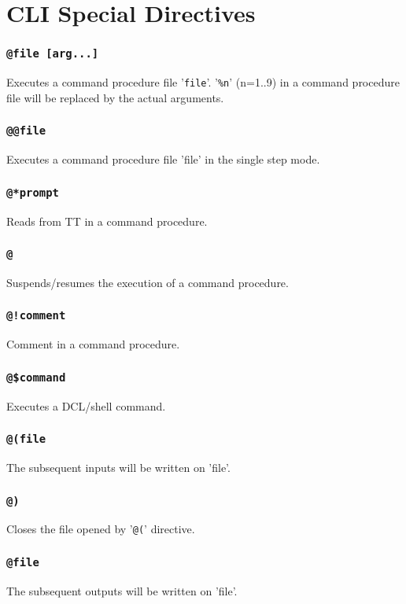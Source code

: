 \chapter{CLI Special Directives}
\subsection*{{\tt @file\ [arg...]}}
  Executes a command procedure file '{\tt file}'. 
  '{\tt \%n}' (n=1..9) in a command 
  procedure file will be replaced by the actual arguments. 

\subsection*{{\tt @@file}}
  Executes a command procedure file 'file' in the single step mode.

\subsection*{{\tt @*prompt}}
  Reads from TT in a command procedure.

\subsection*{{\tt @\LT}}
  Suspends/resumes the execution of a command procedure.

\subsection*{{\tt @!comment}}
  Comment in a command procedure.

\subsection*{{\tt @\$command}}
  Executes a DCL/shell command.

\subsection*{{\tt @(file}}
  The subsequent inputs will be written on 'file'.

\subsection*{{\tt @)}}
  Closes the file opened by '{\tt @(}' directive.

\subsection*{{\tt @\GT file}}
  The subsequent outputs will be written on 'file'.

